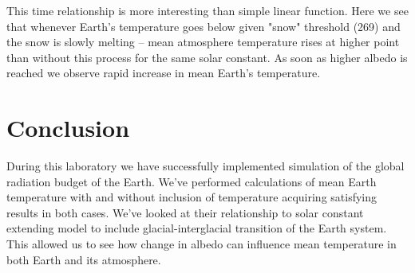 \documentclass[12pt]{article}
\begin{document}
This time relationship is more interesting than simple linear function. Here we see that whenever Earth's temperature goes below given "snow" threshold (269) and the snow is slowly melting -- mean atmosphere temperature rises at higher point than without this process for the same solar constant. As soon as higher albedo is reached we observe rapid increase in mean Earth's temperature.

\section{Conclusion}

During this laboratory we have successfully implemented simulation of the global radiation budget of the Earth. We've performed calculations of mean Earth temperature with and without inclusion of temperature acquiring satisfying results in both cases. We've looked at their relationship to solar constant extending model to include glacial-interglacial transition of the Earth system. This allowed us to see how change in albedo can influence mean temperature in both Earth and its atmosphere.
\end{document}
